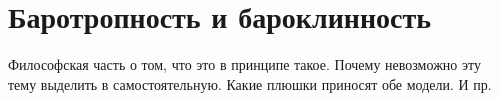 \chapter{Баротропность и бароклинность}

\begin{warn}
    Философская часть о том, что это в принципе такое. Почему невозможно эту тему выделить в самостоятельную. Какие плюшки приносят обе модели. И пр.
\end{warn}